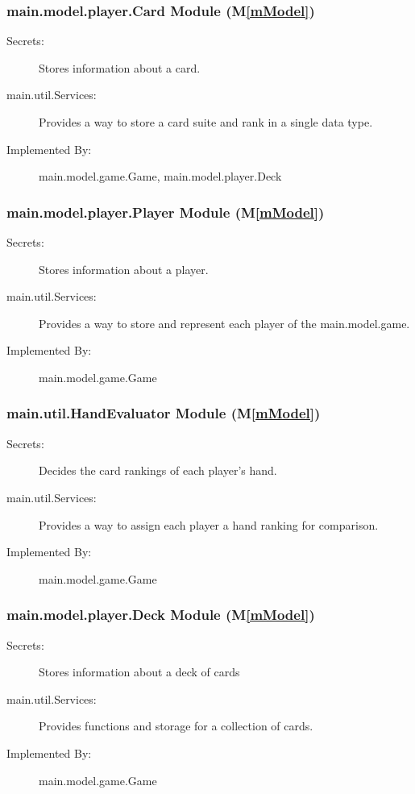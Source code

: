 \documentclass[12pt, titlepage]{article}
\newcommand{\mref}[1]{M\ref{#1}}
\begin{document}
\subsubsection{ main.model.player.Card Module (\mref{mModel})}
    \begin{description}
    \item[Secrets:] Stores information about a card.
    \item[main.util.Services:] Provides a way to store a card suite and rank in a single data type.
    \item[Implemented By:] main.model.game.Game, main.model.player.Deck
    \end{description}

\subsubsection{ main.model.player.Player Module (\mref{mModel})}
    \begin{description}
    \item[Secrets:] Stores information about a player.
    \item[main.util.Services:] Provides a way to store and represent each player of the main.model.game.
    \item[Implemented By:] main.model.game.Game
    \end{description}

\subsubsection{ main.util.HandEvaluator Module (\mref{mModel})}
    \begin{description}
    \item[Secrets:] Decides the card rankings of each player's hand.
    \item[main.util.Services:] Provides a way to assign each player a hand ranking for comparison.
    \item[Implemented By:] main.model.game.Game
    \end{description}

\subsubsection{ main.model.player.Deck Module (\mref{mModel})}
    \begin{description}
    \item[Secrets:] Stores information about a deck of cards
    \item[main.util.Services:] Provides functions and storage for a collection of cards.
    \item[Implemented By:] main.model.game.Game
    \end{description}
    
\end{document}
